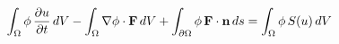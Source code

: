 \documentclass[preview]{standalone}
\begin{document}
\begin{align*}
\special{dvisvgm:raw <g id='unique000'>}\int_\Omega \phi\, \frac{\partial u}{\partial t}\, dV-\int_\Omega \nabla\phi \cdot \mathbf{F}\, dV+\int_{\partial\Omega} \phi\, \mathbf{F}\cdot\mathbf{n}\, ds= \int_\Omega \phi\, S(u)\, dV\special{dvisvgm:raw </g>}
\end{align*}
\end{document}
